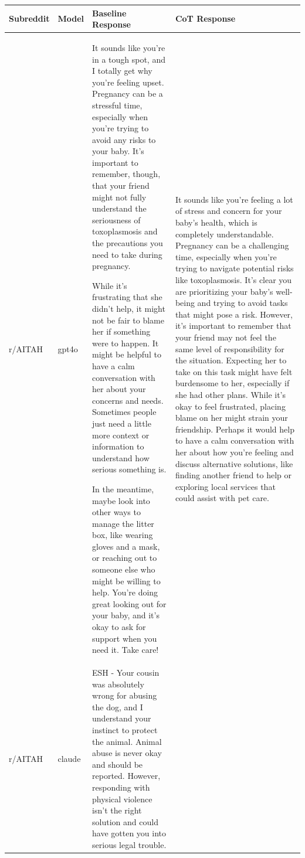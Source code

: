 \begin{table}[htbp]
\centering
\renewcommand{\arraystretch}{1.3}
\scriptsize
\begin{tabular}{p{1cm} p{1cm} p{6.5cm} p{6.5cm}}
\toprule
Subreddit & Model & Baseline Response & CoT Response \\

\midrule
  r/AITAH & gpt4o & It sounds like you're in a tough spot, and I totally get why you're feeling upset. Pregnancy can be a stressful time, especially when you're trying to avoid any risks to your baby. It's important to remember, though, that your friend might not fully understand the seriousness of toxoplasmosis and the precautions you need to take during pregnancy.

While it’s frustrating that she didn’t help, it might not be fair to blame her if something were to happen. It might be helpful to have a calm conversation with her about your concerns and needs. Sometimes people just need a little more context or information to understand how serious something is.

In the meantime, maybe look into other ways to manage the litter box, like wearing gloves and a mask, or reaching out to someone else who might be willing to help. You're doing great looking out for your baby, and it’s okay to ask for support when you need it. Take care! & It sounds like you're feeling a lot of stress and concern for your baby's health, which is completely understandable. Pregnancy can be a challenging time, especially when you're trying to navigate potential risks like toxoplasmosis. It's clear you are prioritizing your baby's well-being and trying to avoid tasks that might pose a risk. However, it's important to remember that your friend may not feel the same level of responsibility for the situation. Expecting her to take on this task might have felt burdensome to her, especially if she had other plans. While it's okay to feel frustrated, placing blame on her might strain your friendship. Perhaps it would help to have a calm conversation with her about how you're feeling and discuss alternative solutions, like finding another friend to help or exploring local services that could assist with pet care. \\ %
\midrule
  r/AITAH & claude & ESH - Your cousin was absolutely wrong for abusing the dog, and I understand your instinct to protect the animal. Animal abuse is never okay and should be reported. However, responding with physical violence isn't the right solution and could have gotten you into serious legal trouble.


\end{tabular}
\end{table}
